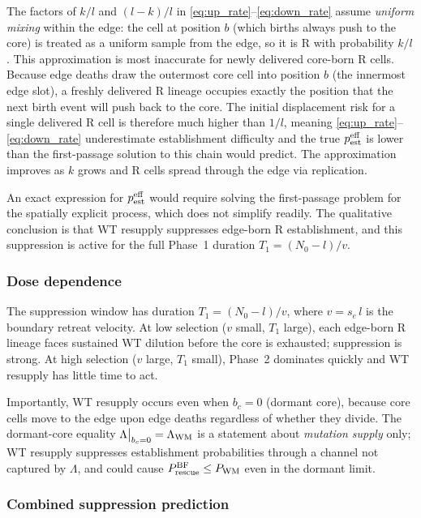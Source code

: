 \documentclass[12pt]{article}
\newcommand{\Nzero}{N_0}
\newcommand{\sEdge}{s_e}
\newcommand{\bCore}{b_c}
\begin{document}
The factors of $k/l$ and $(l-k)/l$ in
\eqref{eq:up_rate}--\eqref{eq:down_rate} assume \emph{uniform mixing}
within the edge: the cell at position $b$ (which births always push to
the core) is treated as a uniform sample from the edge, so it is R with
probability $k/l$. This approximation is most inaccurate for newly
delivered core-born R cells. Because edge deaths draw the outermost core
cell into position $b$ (the innermost edge slot), a freshly delivered R
lineage occupies exactly the position that the next birth event will push
back to the core. The initial displacement risk for a single delivered R
cell is therefore much higher than $1/l$, meaning
\eqref{eq:up_rate}--\eqref{eq:down_rate} underestimate establishment
difficulty and the true $p_{\rm est}^{\rm eff}$ is lower than the
first-passage solution to this chain would predict. The approximation
improves as $k$ grows and R cells spread through the edge via
replication.

An exact expression for $p_{\rm est}^{\rm eff}$ would require solving the
first-passage problem for the spatially explicit process, which does not
simplify readily. The qualitative conclusion is that WT resupply suppresses
edge-born R establishment, and this suppression is active for the full
Phase~1 duration $T_1 = (\Nzero - l)/v$.

\subsubsection*{Dose dependence}

The suppression window has duration $T_1 = (\Nzero - l)/v$, where
$v = \sEdge\,l$ is the boundary retreat velocity. At low selection
($v$ small, $T_1$ large), each edge-born R lineage faces sustained WT
dilution before the core is exhausted; suppression is strong. At high
selection ($v$ large, $T_1$ small), Phase~2 dominates quickly and WT
resupply has little time to act.

Importantly, WT resupply occurs even when $\bCore = 0$ (dormant core),
because core cells move to the edge upon edge deaths regardless of
whether they divide. The dormant-core equality
$\Lambda\big|_{\bCore=0} = \Lambda_{\rm WM}$ is a statement about
\emph{mutation supply} only; WT resupply suppresses establishment
probabilities through a channel not captured by $\Lambda$, and could
cause $P_{\rm rescue}^{\rm BF} \leq P_{\rm WM}$ even in the dormant
limit.

\subsubsection*{Combined suppression prediction}
\end{document}
